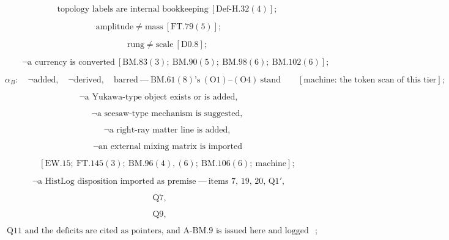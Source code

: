 \documentclass[11pt,openany]{report}
\theoremstyle{canonplain}
\theoremstyle{canondef}
\begin{document}
\[
\qquad \text{topology labels are internal bookkeeping}\ [\mathrm{Def\text{-}H.32}(4)];
\]

\[
\text{amplitude}\ne\text{mass}\ [\mathrm{FT.79}(5)];
\]

\[
\qquad \text{rung}\ne\text{scale}\ [\mathrm{D0.8}];
\]

\[
\qquad \neg\text{a currency is converted}\ [\mathrm{BM.83}(3);\ \mathrm{BM.90}(5);\ \mathrm{BM.98}(6);\ \mathrm{BM.102}(6)];
\]

\[
\alpha_B:\quad\neg\text{added},\quad\neg\text{derived},\quad\text{barred}\ —\ \mathrm{BM.61}(8)\text{'s}\ (\mathrm O1)\text{--}(\mathrm O4)\ \text{stand}\qquad[\text{machine: the token scan of this tier}];
\]

\[
\neg\text{a Yukawa-type object exists or is added},
\]

\[
\qquad \neg\text{a seesaw-type mechanism is suggested},
\]

\[
\qquad \neg\text{a right-ray matter line is added},
\]

\[
\qquad \neg\text{an external mixing matrix is imported}
\]

\[
\qquad [\mathrm{EW.15};\ \mathrm{FT.145}(3);\ \mathrm{BM.96}(4),(6);\ \mathrm{BM.106}(6);\ \text{machine}];
\]

\[
\neg\text{a HistLog disposition imported as premise}\ —\ \text{items 7, 19, 20, Q1}',
\]

\[
\ \text{Q7},
\]

\[
\ \text{Q9},
\]

\[
\ \text{Q11 and the deficits are cited as pointers, and A-BM.9 is issued here and logged before use};
\]
\end{document}

